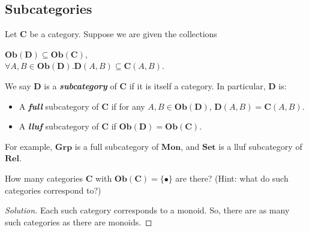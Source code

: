 \documentclass[]{amsbook}
\newcommand{\catname}[1]{\mathbf{#1}}
\newcommand{\0}{\mathbf{0}}
\newcommand{\1}{\mathbf{1}}
\newenvironment{solution}
    {\begin{proof}[Solution]}{\end{proof}}
\begin{document}
\subsection*{Subcategories}
Let $\catname{C}$ be a category. Suppose we are given the collections
\begin{center}
    $\mathbf{Ob}(\catname{D}) \subseteq \mathbf{Ob}(\catname{C})$,\\
    $\forall A, B \in \mathbf{Ob}(\catname{D}).
    \catname{D}(A, B) \subseteq \catname{C}(A, B)$.
\end{center}
We say $\catname{D}$ is a \emph{\textbf{subcategory}} of $\catname{C}$ if
it is itself a category. In particular, $\catname{D}$ is:
\begin{itemize}
    \item A \emph{\textbf{full}} subcategory of $\catname{C}$ if for any
    $A, B \in \mathbf{Ob}(\catname{D})$, $\catname{D}(A, B) = \catname{C}(A, B)$.
    \item  A \emph{\textbf{lluf}} subcategory of $\catname{C}$ if
    $\mathbf{Ob}(\catname{D}) = \mathbf{Ob}(\catname{C})$.
\end{itemize}
For example, $\catname{Grp}$ is a full subcategory of $\catname{Mon}$, and
$\catname{Set}$ is a lluf subcategory of $\catname{Rel}$.

\setcounter{Exercise}{15}
\begin{Exercise}
    How many categories $\catname{C}$ with $\mathbf{Ob}(\catname{C}) =
    \{ \bullet \}$ are there? (Hint: what do such categories correspond to?)
\end{Exercise}
\begin{solution}
    Each such category corresponds to a monoid. So, there are as many such
    categories as there are monoids.
\end{solution}
\end{document}
